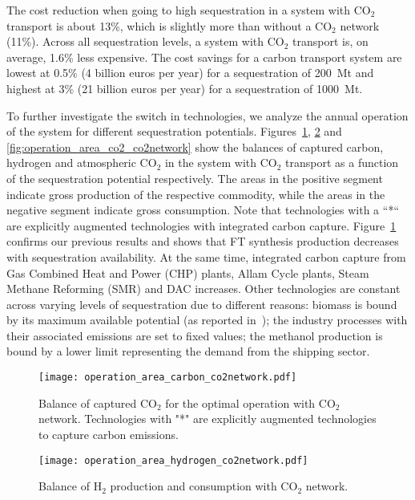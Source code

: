 \documentclass[conference]{IEEEtran}
\newcommand{\carbon}{CO$_2$ }
\newcommand{\hydrogen}{H$_2$ }
\begin{document}
The cost reduction when going to high sequestration in a system with \carbon transport is about 13\%, which is slightly more than without a \carbon network (11\%). Across all sequestration levels, a system with \carbon transport is, on average, 1.6\% less expensive. The cost savings for a carbon transport system are lowest at 0.5\% (4 billion euros per year) for a sequestration of 200~Mt and highest at 3\% (21 billion euros per year) for a sequestration of 1000~Mt.


To further investigate the switch in technologies, we analyze the annual operation of the system for different sequestration potentials. Figures~\ref{fig:operation_area_carbon_co2network}, \ref{fig:operation_area_hydrogen_co2network} and \ref{fig:operation_area_co2_co2network} show the balances of captured carbon, hydrogen and atmospheric \carbon in the system with \carbon transport as a function of the sequestration potential respectively. The areas in the positive segment indicate gross production of the respective commodity, while the areas in the negative segment indicate gross consumption.
Note that technologies with a ``*`` are explicitly augmented technologies with integrated carbon capture.
%
Figure~\ref{fig:operation_area_carbon_co2network} confirms our previous results and shows that FT synthesis production decreases with sequestration availability. At the same time, integrated carbon capture from Gas Combined Heat and Power (CHP) plants, Allam Cycle plants, Steam Methane Reforming (SMR) and DAC increases. Other technologies are constant across varying levels of sequestration due to different reasons: biomass is bound by its maximum available potential (as reported in~\cite{europeancommissionjointresearchcentreENSPRESOBIOMASS2019}); the industry processes with their associated emissions are set to fixed values; the methanol production is bound by a lower limit representing the demand from the shipping sector.
%
\begin{figure}
    \centering
    \texttt{[image: operation\_area\_carbon\_co2network.pdf]}
    \caption{Balance of captured \carbon for the optimal operation with \carbon network. Technologies with "*" are explicitly augmented technologies to capture carbon emissions.}
    \label{fig:operation_area_carbon_co2network}
\end{figure}
%
\begin{figure}
    \centering
    \texttt{[image: operation\_area\_hydrogen\_co2network.pdf]}
    \caption{Balance of \hydrogen production and consumption with \carbon network.}
    \label{fig:operation_area_hydrogen_co2network}
\end{figure}
\end{document}
